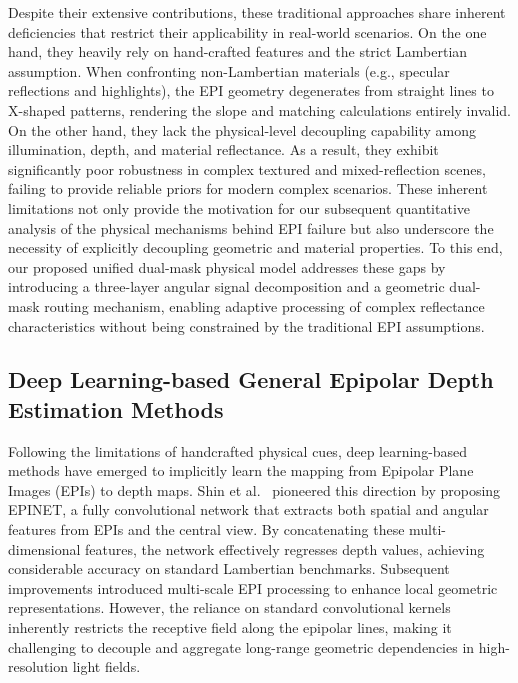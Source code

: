 \documentclass[lettersize,journal]{IEEEtran}
\begin{document}
Despite their extensive contributions, these traditional approaches share inherent deficiencies that restrict their applicability in real-world scenarios. On the one hand, they heavily rely on hand-crafted features and the strict Lambertian assumption. When confronting non-Lambertian materials (e.g., specular reflections and highlights), the EPI geometry degenerates from straight lines to X-shaped patterns, rendering the slope and matching calculations entirely invalid. On the other hand, they lack the physical-level decoupling capability among illumination, depth, and material reflectance. As a result, they exhibit significantly poor robustness in complex textured and mixed-reflection scenes, failing to provide reliable priors for modern complex scenarios. These inherent limitations not only provide the motivation for our subsequent quantitative analysis of the physical mechanisms behind EPI failure but also underscore the necessity of explicitly decoupling geometric and material properties. To this end, our proposed unified dual-mask physical model addresses these gaps by introducing a three-layer angular signal decomposition and a geometric dual-mask routing mechanism, enabling adaptive processing of complex reflectance characteristics without being constrained by the traditional EPI assumptions.

\subsection{Deep Learning-based General Epipolar Depth Estimation Methods}

Following the limitations of handcrafted physical cues, deep learning-based methods have emerged to implicitly learn the mapping from Epipolar Plane Images (EPIs) to depth maps. Shin et al.\ \cite{18} pioneered this direction by proposing EPINET, a fully convolutional network that extracts both spatial and angular features from EPIs and the central view. By concatenating these multi-dimensional features, the network effectively regresses depth values, achieving considerable accuracy on standard Lambertian benchmarks. Subsequent improvements \cite{19} introduced multi-scale EPI processing to enhance local geometric representations. However, the reliance on standard convolutional kernels inherently restricts the receptive field along the epipolar lines, making it challenging to decouple and aggregate long-range geometric dependencies in high-resolution light fields.
\end{document}
